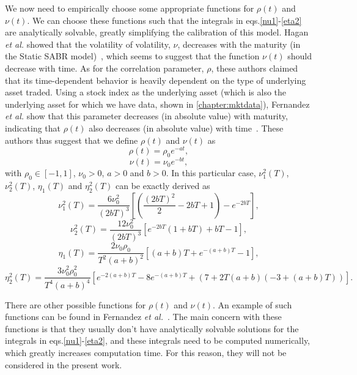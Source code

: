 We now need to empirically choose some appropriate functions for $\rho(t)$ and $\nu(t)$.
We can choose these functions such that the integrals in eqs.\eqref{nu1}-\eqref{eta2} are analytically  solvable, greatly simplifying the calibration of this model. Hagan \textit{et al.} showed that the volatility of volatility, $\nu$, decreases with the maturity (in the Static SABR model)~\citep{Hagan}, which seems to suggest that the function $\nu(t)$ should decrease with time. As for the correlation parameter, $\rho$, these authors claimed that its time-dependent behavior is heavily dependent on the type of underlying asset traded. Using a stock index as the underlying asset (which is also the underlying asset for which we have data, shown in \autoref{chapter:mktdata}), Fernandez \textit{et al.} show that this parameter decreases (in absolute value) with maturity, indicating that $\rho(t)$ also decreases (in absolute value) with time~\citep{Fernandez}.
These authors thus suggest that we define $\rho(t)$ and $\nu(t)$ as
\begin{equation}\label{rhot}
\rho(t)=\rho_0e^{-at},
\end{equation}
\begin{equation}\label{nut}
\nu(t)=\nu_0e^{-bt},
\end{equation}
\noindent with $\rho_0\in[-1,1]$, $\nu_0>0$, $a>0$ and $b>0$.
In this particular case, $\nu_1^2(T)$, $\nu_2^2(T)$, $\eta_1(T)$ and $\eta_2^2(T)$ can be exactly derived as
\begin{equation}
\nu_1^2(T)=\frac{6\nu_0^2}{(2bT)^3}\left[\left(\frac{(2bT)^2}{2}-2bT+1\right)-e^{-2bT}\right],
\end{equation}
\begin{equation}
\nu_2^2(T)=\frac{12\nu_0^2}{(2bT)^3}\left[e^{-2bT}(1+bT)+bT-1\right],
\end{equation}
\begin{equation}
\eta_1(T)=\frac{2\nu_0\rho_0}{T^2(a+b)^2}\left[(a+b)T+e^{-(a+b)T}-1\right],
\end{equation}
\begin{equation}
\eta_2^2(T)=\frac{3\nu_0^2\rho_0^2}{T^4(a+b)^4}\left[e^{-2(a+b)T}-8e^{-(a+b)T}+(7+2T(a+b)(-3+(a+b)T))\right].
\end{equation}

There are other possible functions for $\rho(t)$ and $\nu(t)$. An example of such functions can be found in Fernandez \textit{et al.}~\citep{Fernandez}. The main concern with these functions is that they usually don't have analytically solvable solutions for the integrals in eqs.\eqref{nu1}-\eqref{eta2}, and these integrals need to be computed numerically, which greatly increases computation time. For this reason, they will not be considered in the present work.
